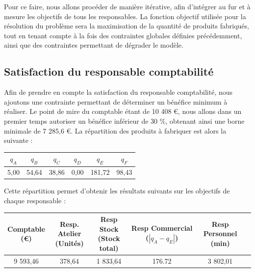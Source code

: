 \documentclass[paper=a4, fontsize=11pt]{report}
\numberwithin{equation}{section}		%
\numberwithin{figure}{section}			%
\numberwithin{table}{section}				%
\newcommand\abs[1]{\left|#1\right|}
\begin{document}
Pour ce faire, nous allons procéder de manière itérative, afin d'intégrer au fur et à mesure les objectifs de tous les responsables. La fonction objectif utilisée pour la résolution du problème sera la maximisation de la quantité de produits fabriqués, tout en tenant compte à la fois des contraintes globales définies précédemment, ainsi que des contraintes permettant de dégrader le modèle. 

\subsection{Satisfaction du responsable comptabilité}

Afin de prendre en compte la satisfaction du responsable comptabilité, nous ajoutons une contrainte permettant de déterminer un bénéfice minimum à réaliser. Le point de mire du comptable étant de 10 408 €, nous allons dans un premier temps autoriser un bénéfice inférieur de 30 \%, obtenant ainsi une borne minimale de 7 285,6 €. La répartition des produits à fabriquer est alors la suivante :

\begin{center}
\begin{tabular}{cccccc}
\hline
$q_A$ & $q_B$ & $q_C$ & $q_D$ & $q_E$ & $q_F$ \\
\hline
5,00 & 54,64 & 38,86 & 0,00 & 181,72 & 98,43 \\
\hline
\end{tabular}
\end{center}

Cette répartition permet d'obtenir les résultats suivants sur les objectifs de chaque responsable : 

\begin{table}[H]
\begin{center}
\begin{tabular}{c|ccccc}
\shortstack{Comptable \\ \scriptsize{(€)}} & \shortstack{Resp. Atelier \\ \scriptsize (Unités)} & \shortstack{Resp Stock \\ \scriptsize (Stock total)} & \shortstack{Resp Commercial \\ \scriptsize ($\abs{q_A - q_E}$)} &   \shortstack{Resp Personnel \\ \scriptsize (min)} \\ 
\hline 
9 593,46 & 378,64 & 1 833,64 & 176.72 & 3 802,01 \\ 
\end{tabular}
\end{center}
\end{table}
\end{document}
